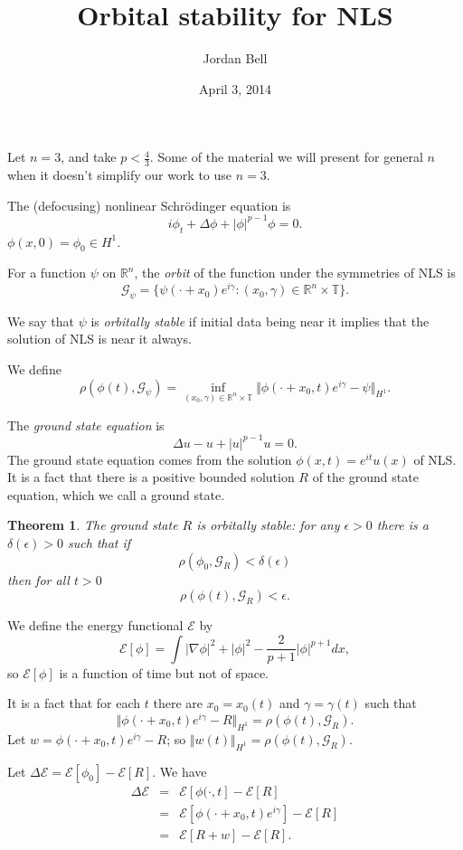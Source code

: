\documentclass{article}
\newtheorem{theorem}{Theorem}
\newcommand{\norm}[1]{\Vert #1 \Vert}
\begin{document}
\title{Orbital stability for NLS}
\author{Jordan Bell}
\date{April 3, 2014}     
\maketitle

Let $n=3$, and take $p<\frac{4}{3}$. Some of the material we will present for general $n$ when it doesn't simplify our work to use $n=3$.

The (defocusing) nonlinear Schr\"odinger equation is
\[
i\phi_t + \Delta \phi + |\phi|^{p-1}\phi=0.
\]
$\phi(x,0)=\phi_0 \in H^1$.

For a function $\psi$ on $\mathbb{R}^n$, the {\em orbit} of the function under the symmetries of NLS is
\[
\mathscr{G}_\psi=\{\psi(\cdot+x_0)e^{i\gamma}:(x_0,\gamma) \in \mathbb{R}^n \times \mathbb{T}\}.
\]

We say that $\psi$ is {\em orbitally stable} if initial data being near it implies that the solution of NLS is near it always.

We define
\[
\rho(\phi(t),\mathscr{G}_\psi)=\inf_{(x_0,\gamma) \in \mathbb{R}^n \times \mathbb{T}} \norm{\phi(\cdot+x_0,t)e^{i\gamma}-\psi}_{H^1}.
\]

The {\em ground state equation} is
\[
\Delta u-u+|u|^{p-1}u=0.
\]
The ground state equation comes from the solution $\phi(x,t)=e^{it}u(x)$ of NLS. It is a fact that there is a positive bounded solution $R$ of the ground state equation, which we call a ground state.

\begin{theorem}
The ground state $R$ is orbitally stable: for any $\epsilon>0$ there is a $\delta(\epsilon)>0$ such that if
\[
\rho(\phi_0,\mathscr{G}_R) < \delta(\epsilon)
\]
then for all $t>0$
\[
\rho(\phi(t),\mathscr{G}_R)<\epsilon.
\]
\end{theorem}

We define the energy functional $\mathscr{E}$ by
\[
\mathscr{E}[\phi]=\int |\nabla \phi|^2+|\phi|^2-\frac{2}{p+1}|\phi|^{p+1}dx,
\]
so $\mathscr{E}[\phi]$ is a function of time but not of space.

It is a fact that for each $t$ there are $x_0=x_0(t)$ and $\gamma=\gamma(t)$ such that
\[
\norm{\phi(\cdot+x_0,t)e^{i\gamma}-R}_{H^1}=\rho(\phi(t),\mathscr{G}_R).
\]
Let $w=\phi(\cdot+x_0,t)e^{i\gamma}-R$; so $\norm{w(t)}_{H^1}=\rho(\phi(t),\mathscr{G}_R)$.
 
 Let $\Delta \mathscr{E}=\mathscr{E}[\phi_0]-\mathscr{E}[R]$. We have
 \begin{eqnarray*}
 \Delta \mathscr{E}&=&\mathscr{E}[\phi(\cdot,t]-\mathscr{E}[R]\\
 &=&\mathscr{E}[\phi(\cdot+x_0,t)e^{i\gamma}]-\mathscr{E}[R]\\
 &=&\mathscr{E}[R+w]-\mathscr{E}[R].
 \end{eqnarray*}
 
\end{document}

